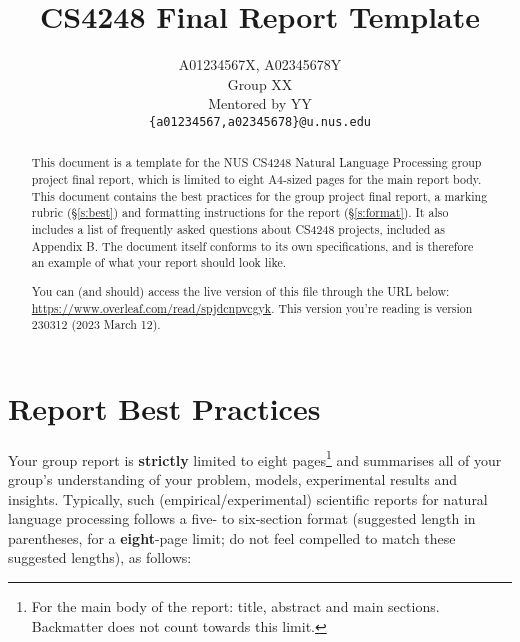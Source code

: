 \documentclass[11pt]{article}
\title{CS4248 Final Report Template}
\author{A01234567X, A02345678Y \\
  Group XX \\
  Mentored by YY \\
  \texttt{\{a01234567,a02345678\}@u.nus.edu}}
\begin{document}
\maketitle
\begin{abstract}
This document is a template for the NUS CS4248 Natural Language Processing group project final report, which is limited to eight A4-sized pages for the main report body. This document contains the best practices for the group project final report, a marking rubric (\S\ref{s:best}) and formatting instructions for the report (\S\ref{s:format}).  It also includes a list of frequently asked questions about CS4248 projects, included as Appendix B. 
The document itself conforms to its own specifications, and is therefore an example of what your report should look like.  

You can (and should) access the live version of this file through the URL below:
\url{https://www.overleaf.com/read/spjdcnpvcgyk}.  This version you're reading is version 230312 (2023 March 12).
\end{abstract}

\section{Report Best Practices}
\label{s:best}

Your group report is {\bf strictly} limited to eight pages\footnote{For the main body of the report: title, abstract and main sections. Backmatter does not count towards this limit.} and summarises all of your group's understanding of your problem, models, experimental results and insights.  Typically, such (empirical/experimental) scientific reports for natural language processing follows a five- to six-section format ({}suggested length in parentheses, for a {\bf eight}-page limit; do not feel compelled to match these suggested lengths), as follows:
\end{document}
